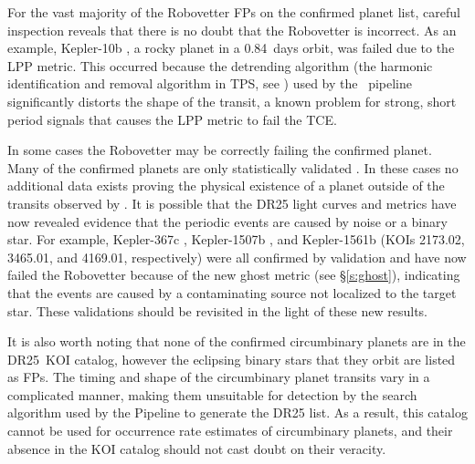 For the vast majority of the Robovetter FPs on the confirmed planet list, careful inspection reveals that there is no doubt that the Robovetter is incorrect. As an example, Kepler-10b \citep[][]{Batalha2011Kepler10,Fogtmann2014Kepler10}, a rocky planet in a 0.84~days orbit, was failed due to the LPP metric. This occurred because the detrending algorithm (the harmonic identification and removal algorithm in TPS, see \citealt{JenkinsKDPH}) used by the \Kepler\ pipeline significantly distorts the shape of the transit, a known problem for strong, short period signals \citep{Christiansen2015} that causes the LPP metric to fail the TCE.

In some cases the Robovetter may be correctly failing the confirmed planet.  Many of the confirmed planets are only statistically validated \citep{Morton2016,Rowe2014}. In these cases no additional data exists proving the physical existence of a planet outside of the transits observed by \Kepler. It is possible that the DR25 light curves and metrics have now revealed evidence that the periodic events are caused by noise or a binary star. For example, Kepler-367c \citep{Rowe2014}, Kepler-1507b \citep{Morton2016}, and Kepler-1561b \citep{Morton2016} (KOIs 2173.02, 3465.01, and 4169.01, respectively) were all confirmed by validation and have now failed the Robovetter because of the new ghost metric (see \S\ref{s:ghost}), indicating that the events are caused by a contaminating source not localized to the target star.  These validations should be revisited in the light of these new results.

It is also worth noting that none of the confirmed circumbinary planets \citep[e.g.,][]{Doyle2011,Orosz2012} are in the DR25~KOI catalog, however the eclipsing binary stars that they orbit are listed as FPs.  The timing and shape of the circumbinary planet transits vary in a complicated manner, making them unsuitable for detection by the search algorithm used by the \Kepler{} Pipeline to generate the DR25 \opstce{} list.  As a result, this catalog cannot be used for occurrence rate estimates of circumbinary planets, and their absence in the KOI catalog should not cast doubt on their veracity. 


